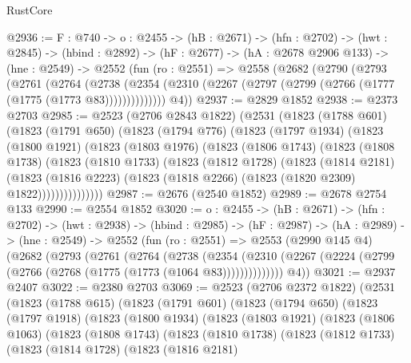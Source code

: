 \begin{lexlean}{RustCore}
\begin{coremodule}
@2936 := {F : @740} ->
  {o : @2455} ->
  (hB : @2671) ->
  (hfn : @2702) ->
  (hwt : @2845) ->
  (hbind : @2892) ->
  (hF : @2677) ->
  (hA : @2678 @2906 @133) ->
  (hne : @2549) ->
  @2552
    (fun (ro : @2551) =>
    @2558
      (@2682
        (@2790
          (@2793
            (@2761
              (@2764
                (@2738
                  (@2354 (@2310 (@2267 (@2797 (@2799 (@2766 (@1777 (@1775 (@1773 @83))))))))))))))
        @4))
@2937 := @2829 @1852
@2938 := @2373 @2703
@2985 := @2523
    (@2706 @2843 @1822)
    (@2531
      (@1823
        (@1788 @601)
        (@1823
          (@1791 @650)
          (@1823
            (@1794 @776)
            (@1823
              (@1797 @1934)
              (@1823
                (@1800 @1921)
                (@1823
                  (@1803 @1976)
                  (@1823
                    (@1806 @1743)
                    (@1823
                      (@1808 @1738)
                      (@1823
                        (@1810 @1733)
                        (@1823
                          (@1812 @1728)
                          (@1823
                            (@1814 @2181)
                            (@1823
                              (@1816 @2223)
                              (@1823 (@1818 @2266) (@1823 (@1820 @2309) @1822)))))))))))))))
@2987 := @2676 (@2540 @1852)
@2989 := @2678 @2754 @133
@2990 := @2554 @1852
@3020 := {o : @2455} ->
  (hB : @2671) ->
  (hfn : @2702) ->
  (hwt : @2938) ->
  (hbind : @2985) ->
  (hF : @2987) ->
  (hA : @2989) ->
  (hne : @2549) ->
  @2552
    (fun (ro : @2551) =>
    @2553
      (@2990 @145 @4)
      (@2682
        (@2793
          (@2761
            (@2764
              (@2738
                (@2354
                  (@2310 (@2267 (@2224 (@2799 (@2766 (@2768 (@1775 (@1773 (@1064 @83))))))))))))))
        @4))
@3021 := @2937 @2407
@3022 := @2380 @2703
@3069 := @2523
    (@2706 @2372 @1822)
    (@2531
      (@1823
        (@1788 @615)
        (@1823
          (@1791 @601)
          (@1823
            (@1794 @650)
            (@1823
              (@1797 @1918)
              (@1823
                (@1800 @1934)
                (@1823
                  (@1803 @1921)
                  (@1823
                    (@1806 @1063)
                    (@1823
                      (@1808 @1743)
                      (@1823
                        (@1810 @1738)
                        (@1823
                          (@1812 @1733)
                          (@1823
                            (@1814 @1728)
                            (@1823
                              (@1816 @2181)

\end{coremodule}
\end{lexlean}
